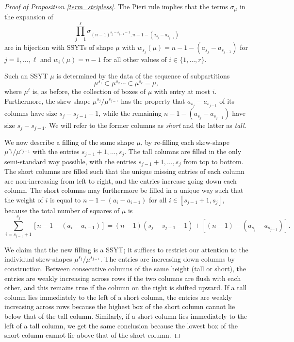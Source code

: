 \documentclass[11pt]{article}
\theoremstyle{definition}
\numberwithin{equation}{section}
\begin{document}
\begin{proof}[Proof of Proposition \ref{term_stripless}]
The Pieri rule implies that the terms $\sigma_\mu$ in the expansion of
\begin{equation*}
 \prod_{j=1}^{\ell}\sigma_{(n-1)^{s_j-s_{j-1}-1},n-1-(a_{s_j}-a_{s_{j-1}})} 
 \end{equation*}
 are in bijection with SSYTs of shape $\mu$ with $w_{s_j}(\mu)=n-1-(a_{s_j}-a_{s_{j-1}})$ for $j=1,\ldots,\ell$ and $w_{i}(\mu)=n-1$ for all other values of $i\in\{1,\ldots,r\}$.

Such an SSYT $\mu$ is determined by the data of the sequence of subpartitions
\begin{equation*}
\mu^{s_1}\subset\mu^{s_2}\cdots\subset\mu^{s_\ell}=\mu,
 \end{equation*}
where $\mu^i$ is, as before, the collection of boxes of $\mu$ with entry at most $i$. Furthermore, the skew shape $\mu^{s_j}/\mu^{s_{j-1}}$ has the property that $a_{s_j}-a_{s_{j-1}}$ of its columns have size $s_j-s_{j-1}-1$, while the remaining $n-1-(a_{s_j}-a_{s_{j-1}})$ have size $s_j-s_{j-1}$. We will refer to the former columns as \emph{short} and the latter as \emph{tall}. 

We now describe a filling of the same shape $\mu$, by re-filling each skew-shape $\mu^{s_j}/\mu^{s_{j-1}}$ with the entries $s_{j-1}+1,\ldots,s_j$. The tall columns are filled in the only semi-standard way possible, with the entries $s_{j-1}+1,\ldots,s_j$ from top to bottom. The short columns are filled such that the unique missing entries of each column are non-increasing from left to right, and the entries increase going down each column. The short columns may furthermore be filled in a unique way such that the weight of $i$ is equal to $n-1-(a_{i}-a_{i-1})$ for all $i\in[s_{j-1}+1,s_j]$, because the total number of squares of $\mu$ is
\begin{equation*}
\sum_{i=s_{j-1}+1}^{s_j}[n-1-(a_{i}-a_{i-1})]=(n-1)(s_j-s_{j-1}-1)+[(n-1)-(a_{s_j}-a_{s_{j-1}})].
\end{equation*}

We claim that the new filling is a SSYT; it suffices to restrict our attention to the individual skew-shapes $\mu^{s_j}/\mu^{s_{j-1}}$. The entries are increasing down columns by construction. Between consecutive columns of the same height (tall or short), the entries are weakly increasing across rows if the two columns are flush with each other, and this remains true if the column on the right is shifted upward. If a tall column lies immediately to the left of a short column, the entries are weakly increasing across rows because the highest box of the short column cannot lie below that of the tall column. Similarly, if a short column lies immediately to the left of a tall column, we get the same conclusion because the lowest box of the short column cannot lie above that of the short column.


\end{proof}
\end{document}
